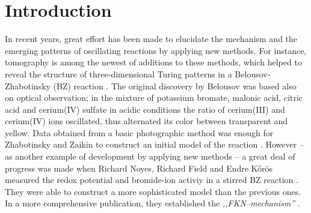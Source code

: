 \documentclass[3p, twocolumn]{elsarticle}
\begin{document}
\section{Introduction}
In recent years, great effort has been made to elucidate the mechanism and the emerging patterns of oscillating reactions by applying new methods.
For instance, tomography is among the newest of additions to these methods, which helped to reveal the structure of three-dimensional Turing patterns in a Belousov-Zhabotinsky (BZ) reaction \cite{bansagi2011}.
The original discovery by Belousov was based also on optical observation; in the mixture of potassium bromate, malonic acid, citric acid and cerium(IV) sulfate in acidic conditions the ratio of cerium(III) and cerium(IV) ions oscillated, thus alternated its color between transparent and yellow.
Data obtained from a basic photographic method was enough for Zhabotinsky and Zaikin to construct an initial model of the reaction \cite{zaikin1970}.
However -- as another example of development by applying new methods -- a great deal of progress was made when Richard Noyes, Richard Field and Endre Kőrös measured the redox potential and bromide-ion activiy in a stirred BZ reaction \cite{fkn1}.
They were able to construct a more sophisticated model than the previous ones.
In a more comprehensive publication, they established the \emph{,,FKN--mechanism''} \cite{fkn2}.



\end{document}
